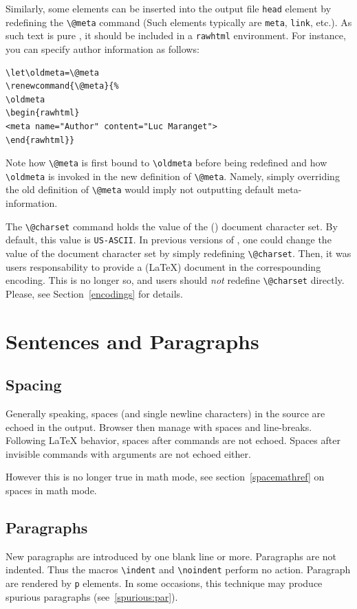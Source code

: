 \label{exlet}Similarly, some elements can be inserted into the output file
\verb+head+ element by redefining the \verb+\@meta+ command
(Such elements typically are \verb+meta+, \verb+link+, etc.).
As such text is pure \html{}, it should be included in a
\verb+rawhtml+ environment. For instance, you can specify
author information as follows:
\begin{verbatim}
\let\oldmeta=\@meta
\renewcommand{\@meta}{%
\oldmeta
\begin{rawhtml}
<meta name="Author" content="Luc Maranget">
\end{rawhtml}}
\end{verbatim}
Note how \verb+\@meta+ is first bound to
\verb+\oldmeta+ before being redefined and how \verb+\oldmeta+ is
invoked in the new definition of \verb+\@meta+.
Namely, simply overriding the old definition of \verb+\@meta+ would
imply not outputting default meta-information.

The \verb+\@charset+ command holds the value of the (\html) document character
set. By default, this value is \texttt{US-ASCII}.
In previous versions of \hevea{}, one could change the
value of the document character set by simply redefining
\verb+\@charset+. Then, it was users responsability to provide a
(\LaTeX) document in the correspounding encoding.
This is no longer so, and users should \emph{not} redefine
\verb+\@charset+ directly. Please, see Section~\ref{encodings} for details.


\section{Sentences and Paragraphs}

\subsection{Spacing}
Generally speaking, spaces (and single newline characters) in the
source are echoed in the output.  Browser then manage with spaces and
line-breaks.  Following \LaTeX{} behavior, spaces after commands are
not echoed.  Spaces after invisible commands with arguments are not
echoed either.

However this is no longer true in math mode, see
section~\ref{spacemathref} on spaces in math mode.

\subsection{Paragraphs}
New paragraphs are introduced by one blank line or more.
Paragraphs are not indented. Thus the macros \verb+\indent+ and
\verb+\noindent+ perform no action.
Paragraph are rendered by \verb+p+ elements.
In some occasions, this technique may produce spurious paragraphs
(see~\ref{spurious:par}).

